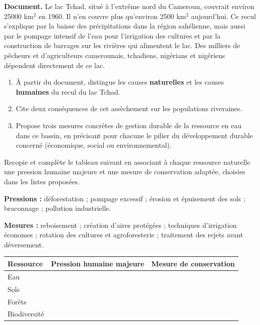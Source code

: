 \documentclass[11pt]{article}
\newcounter{popsec}
\newcounter{popsub}
\newcommand{\courssub}[1]{%
  \stepcounter{popsub}%
  \par\vspace{9pt}\noindent{\popxbold\fontsize{11.5}{13}\selectfont\color{popink}{\color{poporange}\thepopsec.\thepopsub}\hspace{6pt}#1}\par\nopagebreak\vspace{4pt}
}
\begin{document}
\courssub{Je m'entraîne}

\begin{exercice}
\textbf{Document.} Le lac Tchad, situé à l'extrême nord du Cameroun, couvrait environ \num{25000} km$^2$ en 1960. Il n'en couvre plus qu'environ \num{2500} km$^2$ aujourd'hui. Ce recul s'explique par la baisse des précipitations dans la région sahélienne, mais aussi par le pompage intensif de l'eau pour l'irrigation des cultures et par la construction de barrages sur les rivières qui alimentent le lac. Des milliers de pêcheurs et d'agriculteurs camerounais, tchadiens, nigérians et nigériens dépendent directement de ce lac.
\begin{enumerate}
\item À partir du document, distingue les causes \textbf{naturelles} et les causes \textbf{humaines} du recul du lac Tchad.
\item Cite deux conséquences de cet assèchement sur les populations riveraines.
\item Propose trois mesures concrètes de gestion durable de la ressource en eau dans ce bassin, en précisant pour chacune le pilier du développement durable concerné (économique, social ou environnemental).
\end{enumerate}
\end{exercice}

\begin{exercice}
Recopie et complète le tableau suivant en associant à chaque ressource naturelle une pression humaine majeure et une mesure de conservation adaptée, choisies dans les listes proposées.

\textbf{Pressions :} déforestation ; pompage excessif ; érosion et épuisement des sols ; braconnage ; pollution industrielle.

\textbf{Mesures :} reboisement ; création d'aires protégées ; techniques d'irrigation économes ; rotation des cultures et agroforesterie ; traitement des rejets avant déversement.

\begin{center}
\begin{tabularx}{\linewidth}{|l|X|X|}\hline
\rowcolor{popblueL} \textbf{Ressource} & \textbf{Pression humaine majeure} & \textbf{Mesure de conservation} \\ \hline
Eau & & \\ \hline
Sols & & \\ \hline
Forêts & & \\ \hline
Biodiversité & & \\ \hline
\end{tabularx}
\end{center}
\end{exercice}
\end{document}
